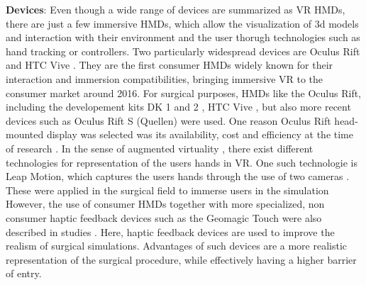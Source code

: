 \textbf{Devices}: Even though a wide range of devices are summarized as VR HMDs, there are just a few immersive HMDs, which allow the visualization of 3d models and interaction with their environment and the user thorugh technologies such as hand tracking or controllers.
\newline
Two particularly widespread devices are Oculus Rift \cite{OculusRift} and HTC Vive \cite{Vive}.
They are the first consumer HMDs widely known for their interaction and immersion compatibilities, bringing immersive VR to the consumer market around 2016.
For surgical purposes, HMDs like the Oculus Rift, including the developement kits DK 1 and 2 \cite{Parham.2019, Pulijala.2017,Sampogna.2017}, HTC Vive \cite{.2017, Barber.2020}, but also more recent devices such as Oculus Rift S (Quellen) were used.
\newline
One reason Oculus Rift head-mounted display was selected was its availability, cost and efficiency at the time of research \cite{Pulijala.2017}.
\newline
In the sense of augmented virtuality \cite{milgram1994taxonomy}, there exist different technologies for representation of the users hands in VR.
One such technologie is Leap Motion, which captures the users hands through the use of two cameras \cite{LeapMotion}.
These were applied in the surgical field to immerse users in the simulation \cite{Pulijala.2017, Sampogna.2017}
\newline
However, the use of consumer HMDs together with more specialized, non consumer haptic feedback devices such as the Geomagic Touch were also described in studies \cite{VenkataS.Arikatla.2018}.
Here, haptic feedback devices are used to improve the realism of surgical simulations. 
Advantages of such devices are a more realistic representation of the surgical procedure, while effectively having a higher barrier of entry.